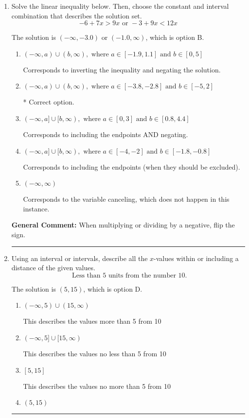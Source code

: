 \documentclass{extbook}[14pt]
\newcommand{\litem}[1]{\item #1

\rule{\textwidth}{0.4pt}}
\begin{document}
\begin{enumerate}\litem{
Solve the linear inequality below. Then, choose the constant and interval combination that describes the solution set.
\[ -6 + 7 x > 9 x \text{ or } -3 + 9 x < 12 x \]

The solution is \( (-\infty, -3.0) \text{ or } (-1.0, \infty) \), which is option B.\begin{enumerate}[label=\Alph*.]
\item \( (-\infty, a) \cup (b, \infty), \text{ where } a \in [-1.9, 1.1] \text{ and } b \in [0, 5] \)

Corresponds to inverting the inequality and negating the solution.
\item \( (-\infty, a) \cup (b, \infty), \text{ where } a \in [-3.8, -2.8] \text{ and } b \in [-5, 2] \)

 * Correct option.
\item \( (-\infty, a] \cup [b, \infty), \text{ where } a \in [0, 3] \text{ and } b \in [0.8, 4.4] \)

Corresponds to including the endpoints AND negating.
\item \( (-\infty, a] \cup [b, \infty), \text{ where } a \in [-4, -2] \text{ and } b \in [-1.8, -0.8] \)

Corresponds to including the endpoints (when they should be excluded).
\item \( (-\infty, \infty) \)

Corresponds to the variable canceling, which does not happen in this instance.
\end{enumerate}

\textbf{General Comment:} When multiplying or dividing by a negative, flip the sign.
}
\litem{
Using an interval or intervals, describe all the $x$-values within or including a distance of the given values.
\[ \text{ Less than } 5 \text{ units from the number } 10. \]

The solution is \( (5, 15) \), which is option D.\begin{enumerate}[label=\Alph*.]
\item \( (-\infty, 5) \cup (15, \infty) \)

This describes the values more than 5 from 10
\item \( (-\infty, 5] \cup [15, \infty) \)

This describes the values no less than 5 from 10
\item \( [5, 15] \)

This describes the values no more than 5 from 10
\item \( (5, 15) \)


\end{enumerate}}
\end{enumerate}
\end{document}
